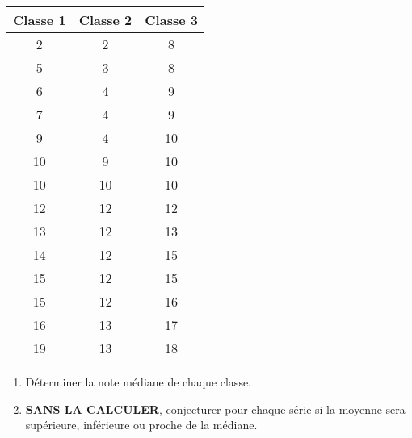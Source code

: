 \begin{multicols}{2}
\begin{exo}

\begin{center}
\begin{small}
\begin{tabular}{|c|c|c|}
\hline
Classe 1 & Classe 2 & Classe 3 \\ \hline
2&2&8\\ \hline
5&3&8\\ \hline
6&4&9\\ \hline
7&4&9\\ \hline
9&4&10\\ \hline
10&9&10\\ \hline
10&10&10\\ \hline
12&12&12\\ \hline
13&12&13\\ \hline
14&12&15\\ \hline
15&12&15\\ \hline
15&12&16\\ \hline
16&13&17\\ \hline
19&13&18\\ \hline
\end{tabular}             \end{small}\end{center}

\begin{enumerate}
	\item D\'eterminer la note m\'ediane de chaque classe.
	\item \textbf{SANS LA CALCULER}, conjecturer pour chaque s\'erie si la moyenne sera
sup\'erieure, inf\'erieure ou proche de la m\'ediane.
\end{enumerate}



\end{exo}
\end{multicols}


